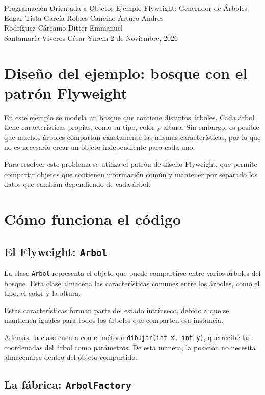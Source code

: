 \documentclass{article}
\begin{document}
\portadapractica
    {Programación Orientada a Objetos}
    {Ejemplo Flyweight: Generador de Árboles}
    {Edgar Tista García}
    {Robles Cancino Arturo Andres\\
    Rodríguez Cárcamo Ditter Emmanuel\\
    Santamaría Viveros César Yurem}
    {2 de Noviembre, 2026}

\section{Diseño del ejemplo: bosque con el patrón Flyweight}

En este ejemplo se modela un bosque que contiene distintos árboles.
Cada árbol tiene características propias, como su tipo, color y altura.
Sin embargo, es posible que muchos árboles compartan exactamente las
mismas características, por lo que no es necesario crear un objeto
independiente para cada uno.

Para resolver este problema se utiliza el patrón de diseño Flyweight,
que permite compartir objetos que contienen información común y
mantener por separado los datos que cambian dependiendo de cada árbol.

\section{Cómo funciona el código}

\subsection{El Flyweight: \texttt{Arbol}}

La clase \texttt{Arbol} representa el objeto que puede compartirse entre
varios árboles del bosque. Esta clase almacena las características
comunes entre los árboles, como el tipo, el color y la altura.

Estas características forman parte del estado intrínseco, debido a que
se mantienen iguales para todos los árboles que comparten esa instancia.

Además, la clase cuenta con el método \texttt{dibujar(int x, int y)},
que recibe las coordenadas del árbol como parámetros. De esta manera,
la posición no necesita almacenarse dentro del objeto compartido.

\subsection{La fábrica: \texttt{ArbolFactory}}
\end{document}
